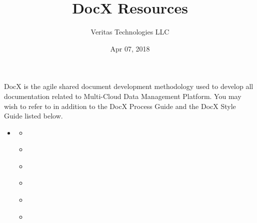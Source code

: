 \documentclass[letterpaper,10pt,english]{sphinxmanual}
\title{DocX Resources}
\date{Apr 07, 2018}
\author{Veritas Technologies LLC}
\begin{document}
\maketitle
\sphinxtableofcontents
{}\label{\detokenize{mcdmp_docx_res::doc}}


DocX is the agile shared document development methodology used to develop all documentation related to Multi-Cloud Data Management Platform. You may wish to refer to  in addition to the DocX Process Guide and the DocX Style Guide listed below.

\begin{sphinxShadowBox}
\begin{itemize}
\item {} 
\label{\detokenize{mcdmp_docx_res:id11}}{\hyperref[\detokenize{mcdmp_docx_res:mcdmp-shared-development-of-documentation}]{}}
\begin{itemize}
\item {} 
\label{\detokenize{mcdmp_docx_res:id12}}{\hyperref[\detokenize{mcdmp_docx_res:what-s-in-a-name}]{}}

\item {} 
\label{\detokenize{mcdmp_docx_res:id13}}{\hyperref[\detokenize{mcdmp_docx_res:objective}]{}}

\item {} 
\label{\detokenize{mcdmp_docx_res:id14}}{\hyperref[\detokenize{mcdmp_docx_res:shared-doc-development-process-highlights}]{}}

\item {} 
\label{\detokenize{mcdmp_docx_res:id15}}{\hyperref[\detokenize{mcdmp_docx_res:how-it-works}]{}}

\item {} 
\label{\detokenize{mcdmp_docx_res:id16}}{\hyperref[\detokenize{mcdmp_docx_res:how-to-contribute}]{}}

\item {} 
\label{\detokenize{mcdmp_docx_res:id17}}{\hyperref[\detokenize{mcdmp_docx_res:use-cases-applying-model-to-mcdmp-documentation-workflows}]{}}


\end{itemize}
\end{itemize}
\end{sphinxShadowBox}
\end{document}
